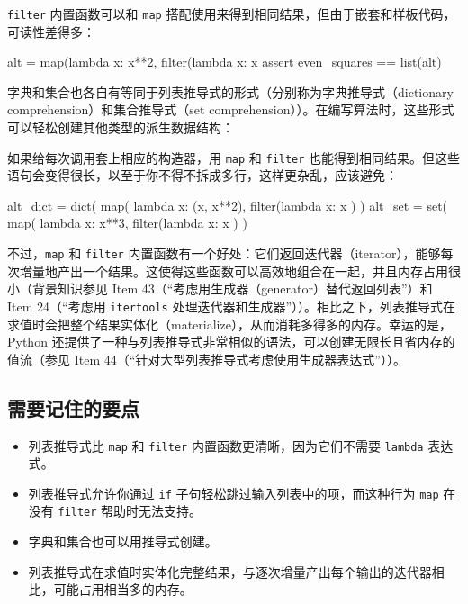 \texttt{filter} 内置函数可以和 \texttt{map} 搭配使用来得到相同结果，但由于嵌套和样板代码，可读性差得多：

\begin{codebox}[python]
alt = map(lambda x: x**2, filter(lambda x: x %
assert even_squares == list(alt)
\end{codebox}

字典和集合也各自有等同于列表推导式的形式（分别称为字典推导式（dictionary comprehension）和集合推导式（set comprehension））。在编写算法时，这些形式可以轻松创建其他类型的派生数据结构：


如果给每次调用套上相应的构造器，用 \texttt{map} 和 \texttt{filter} 也能得到相同结果。但这些语句会变得很长，以至于你不得不拆成多行，这样更杂乱，应该避免：

\begin{codebox}[python]
alt_dict = dict(
    map(
        lambda x: (x, x**2),
        filter(lambda x: x %
    )
)
alt_set = set(
    map(
        lambda x: x**3,
        filter(lambda x: x %
    )
)
\end{codebox}

不过，\texttt{map} 和 \texttt{filter} 内置函数有一个好处：它们返回迭代器（iterator），能够每次增量地产出一个结果。这使得这些函数可以高效地组合在一起，并且内存占用很小（背景知识参见 Item 43（``考虑用生成器（generator）替代返回列表''）和 Item 24（``考虑用 \texttt{itertools} 处理迭代器和生成器''））。相比之下，列表推导式在求值时会把整个结果实体化（materialize），从而消耗多得多的内存。幸运的是，Python 还提供了一种与列表推导式非常相似的语法，可以创建无限长且省内存的值流（参见 Item 44（``针对大型列表推导式考虑使用生成器表达式''））。

\subsection{需要记住的要点}

\begin{itemize}
\item 列表推导式比 \texttt{map} 和 \texttt{filter} 内置函数更清晰，因为它们不需要 \texttt{lambda} 表达式。
\item 列表推导式允许你通过 \texttt{if} 子句轻松跳过输入列表中的项，而这种行为 \texttt{map} 在没有 \texttt{filter} 帮助时无法支持。
\item 字典和集合也可以用推导式创建。
\item 列表推导式在求值时实体化完整结果，与逐次增量产出每个输出的迭代器相比，可能占用相当多的内存。
\end{itemize}

